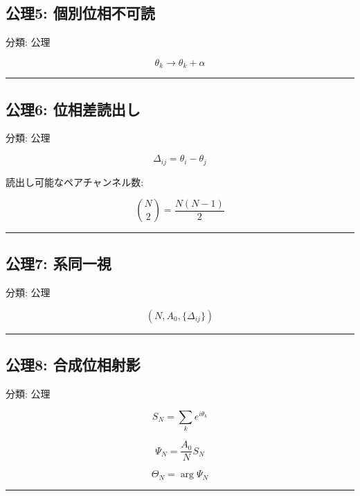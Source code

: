 \documentclass[
  a4paper,
]{ltjsarticle}
\begin{document}
\subsection{公理5:
個別位相不可読}\label{ux516cux74065-ux500bux5225ux4f4dux76f8ux4e0dux53efux8aad}

分類: 公理

\[
\theta_k\rightarrow\theta_k+\alpha
\]

\begin{center}\rule{0.5\linewidth}{0.5pt}\end{center}

\subsection{公理6:
位相差読出し}\label{ux516cux74066-ux4f4dux76f8ux5deeux8aadux51faux3057}

分類: 公理

\[
\Delta_{ij}=\theta_i-\theta_j
\]

読出し可能なペアチャンネル数:

\[
\binom{N}{2}=\frac{N(N-1)}{2}
\]

\begin{center}\rule{0.5\linewidth}{0.5pt}\end{center}

\subsection{公理7:
系同一視}\label{ux516cux74067-ux7cfbux540cux4e00ux8996}

分類: 公理

\[
(N,A_0,\{\Delta_{ij}\})
\]

\begin{center}\rule{0.5\linewidth}{0.5pt}\end{center}

\subsection{公理8:
合成位相射影}\label{ux516cux74068-ux5408ux6210ux4f4dux76f8ux5c04ux5f71}

分類: 公理

\[
S_N=\sum_k e^{i\theta_k}
\]

\[
\Psi_N=\frac{A_0}{N}S_N
\]

\[
\Theta_N=\arg\Psi_N
\]

\begin{center}\rule{0.5\linewidth}{0.5pt}\end{center}
\end{document}
